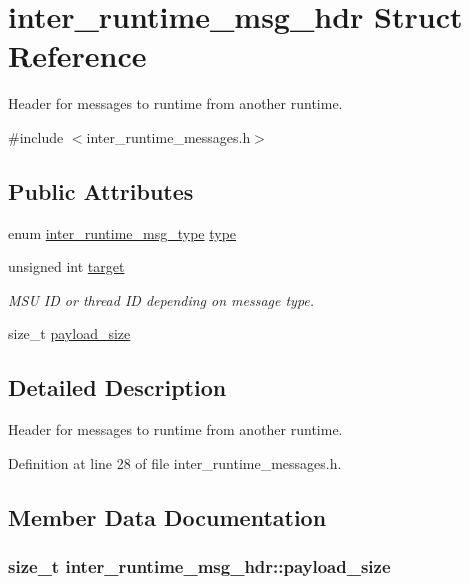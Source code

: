\hypertarget{structinter__runtime__msg__hdr}{\section{inter\-\_\-runtime\-\_\-msg\-\_\-hdr Struct Reference}
\label{structinter__runtime__msg__hdr}
}


Header for messages to runtime from another runtime.  




{\ttfamily \#include $<$inter\-\_\-runtime\-\_\-messages.\-h$>$}

\subsection*{Public Attributes}
\begin{DoxyCompactItemize}
\item 
enum \hyperlink{inter__runtime__messages_8h_af4d9db643346db669665f73f9e1b7b63}{inter\-\_\-runtime\-\_\-msg\-\_\-type} \hyperlink{structinter__runtime__msg__hdr_aa3fd1b24d760f993758fde89bc392667}{type}
\item 
unsigned int \hyperlink{structinter__runtime__msg__hdr_ab55150bdbe4ae70e8e647f29f1568920}{target}
\begin{DoxyCompactList}\small\item\em M\-S\-U I\-D or thread I\-D depending on message type. \end{DoxyCompactList}\item 
size\-\_\-t \hyperlink{structinter__runtime__msg__hdr_a9c597e65ffc48a8b8278ddd0a0087440}{payload\-\_\-size}
\end{DoxyCompactItemize}


\subsection{Detailed Description}
Header for messages to runtime from another runtime. 

Definition at line 28 of file inter\-\_\-runtime\-\_\-messages.\-h.



\subsection{Member Data Documentation}
\hypertarget{structinter__runtime__msg__hdr_a9c597e65ffc48a8b8278ddd0a0087440}{
\subsubsection[{payload\-\_\-size}]{\setlength{\rightskip}{0pt plus 5cm}size\-\_\-t inter\-\_\-runtime\-\_\-msg\-\_\-hdr\-::payload\-\_\-size}}\label{structinter__runtime__msg__hdr_a9c597e65ffc48a8b8278ddd0a0087440}


